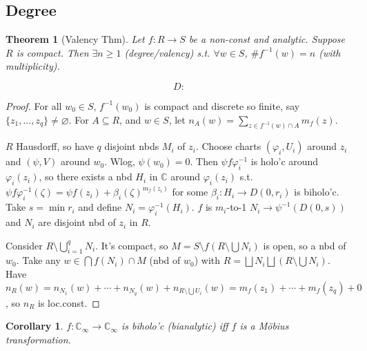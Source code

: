 \documentclass{article}
\theoremstyle{definition}
\theoremstyle{remark}
\theoremstyle{plain}
\newtheorem{thm}[defn]{Theorem}
\newtheorem{crly}[defn]{Corollary}
\newcommand{\CC}{\mathbb{C}}
\begin{document}
\subsection{Degree}
\begin{thm}[Valency Thm]
    Let $f:R\to S$ be a non-const and analytic. Suppose $R$ is compact. Then $\exists n\ge 1$ (degree/valency) s.t. $\forall w\in S$, $\# f^{-1}(w)=n$ (with multiplicity).
\end{thm}
\[D:\tag{Owen's Signature}\]
\begin{proof}
    For all $w_0\in S$, $f^{-1}(w_0)$ is compact and discrete so finite, say $\{z_1,...,z_q\}\neq\varnothing$. For $A\subseteq R$, and $w\in S$, let $n_A(w)=\sum_{z\in f^{-1}(w)\cap A}m_f(z)$. 

    $R$ Hausdorff, so have $q$ disjoint nbds $M_i$ of $z_i$. Choose charts $(\varphi_i,U_i)$ around $z_i$ and $(\psi,V)$ around $w_0$. Wlog, $\psi(w_0)=0$. Then $\psi f\varphi_i^{-1}$ is holo'c around $\varphi_i(z_i)$, so there exists a nbd $H_i$ in  $\CC$ around $\varphi_i(z_i)$ s.t. $\psi f\varphi_i^{-1}(\zeta)=\psi f(z_i)+\beta_i(\zeta)^{m_f(z_i)}$ for some $\beta_i:H_i\to D(0,r_i)$ is biholo'c. Take $s=\min r_i$ and define $N_i=\varphi_i^{-1}(H_i)$. $f$ is $m_i$-to-1 $N_i\to\psi^{-1}(D(0,s))$ and $N_i$ are disjoint nbd of $z_i$ in $R$.

    Consider $R\setminus\bigcup_{i=1}^q N_i$. It's compact, so $M=S\setminus f(R\setminus \bigcup N_i)$ is open, so a nbd of $w_0$. Take any $w\in\bigcap f(N_i)\cap M$ (nbd of $w_0$) with $R=\bigsqcup N_i\bigsqcup (R\setminus\bigcup N_i)$. Have $n_R(w)=n_{N_1}(w)+\cdots+n_{N_q}(w)+n_{R\setminus \bigcup U_i}(w)=m_f(z_1)+\cdots+m_f(z_q)+0$, so $n_R$ is loc.const.
\end{proof}
\begin{crly}
    $f:\CC_\infty\to\CC_\infty$ is biholo'c (bianalytic) iff $f$ is a M\"obius transformation.
\end{crly}
\end{document}

